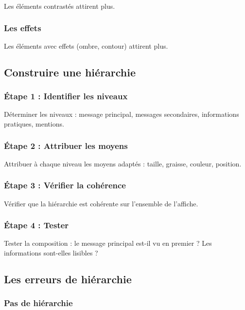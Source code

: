 Les éléments contrastés attirent plus.

\subsubsection{Les effets}

Les éléments avec effets (ombre, contour) attirent plus.

\subsection{Construire une hiérarchie}

\subsubsection{Étape 1 : Identifier les niveaux}

Déterminer les niveaux : message principal, messages secondaires, informations pratiques, mentions.

\subsubsection{Étape 2 : Attribuer les moyens}

Attribuer à chaque niveau les moyens adaptés : taille, graisse, couleur, position.

\subsubsection{Étape 3 : Vérifier la cohérence}

Vérifier que la hiérarchie est cohérente sur l'ensemble de l'affiche.

\subsubsection{Étape 4 : Tester}

Tester la composition : le message principal est-il vu en premier ? Les informations sont-elles lisibles ?

\subsection{Les erreurs de hiérarchie}

\subsubsection{Pas de hiérarchie}


